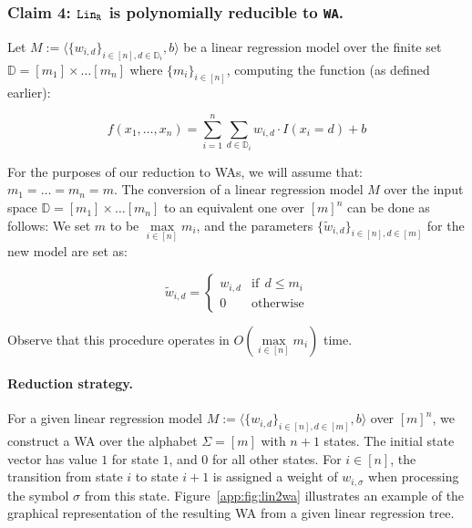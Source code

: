 \subsubsection{Claim 4: $\texttt{\text{Lin}}_{\texttt{\text{R}}}$ is polynomially reducible to \texttt{WA}.}

Let $M := \langle \{w_{i,d}\}_{i \in [n], d \in \mathbb{D}_{i}}, b\rangle$ be a linear regression model over the finite set $\mathbb{D} = [m_{1}] \times \ldots [m_{n}]$ where $\{m_{i}\}_{i \in [n]}$, computing the function (as defined earlier):


$$f(x_{1}, \ldots , x_{n}) = \sum\limits_{i=1}^{n} \sum\limits_{d \in \mathbb{D}_{i}} w_{i,d} \cdot I(x_{i}=d) + b$$


For the purposes of our reduction to WAs, we will assume that: $m_{1} = \ldots = m_{n} = m$.
The conversion of a linear regression model $M$ over the input space $\mathbb{D} = [m_{1}] \times \ldots [m_{n}]$ to an equivalent one over $[m]^{n}$ can be done as follows: We set $m$ to be $\max\limits_{i\in [n]} m_{i}$, and the parameters $\{\tilde{w}_{i,d}\}_{i \in [n], d \in [m]}$ for the new model are set as:


$$\tilde{w}_{i,d} = \begin{cases}
    w_{i,d} & \text{if} ~~ d \leq m_{i} \\
    0 & \text{otherwise}
\end{cases}$$


Observe that this procedure operates in $O(\max\limits_{i \in [n]} m_{i})$ time.

\paragraph{Reduction strategy.} For a given linear regression model $M := \langle\{w_{i,d}\}_{i \in [n], d \in [m]},b\rangle$ over $[m]^{n}$, we construct a WA over the alphabet $\Sigma = [m]$ with $n+1$ states. The initial state vector has value $1$ for state $1$, and $0$ for all other states. For $i \in [n]$, the transition from state $i$ to state $i+1$ is assigned a weight of $w_{i,\sigma}$ when processing the symbol $\sigma$ from this state. Figure~\ref{app:fig:lin2wa} illustrates an example of the graphical representation of the resulting WA from a given linear regression tree.

